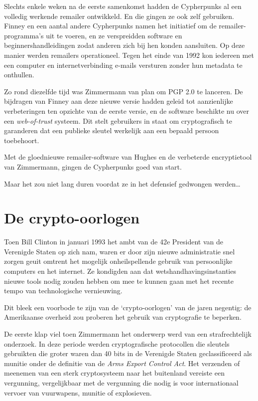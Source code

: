 \documentclass[
  a5paper,
  smalldemyvopaper,11pt,twoside,onecolumn,openright,extrafontsizes]{memoir}
\begin{document}
Slechts enkele weken na de eerste samenkomst hadden de Cypherpunks al
een volledig werkende remailer ontwikkeld. En die gingen ze ook zelf
gebruiken. Finney en een aantal andere Cypherpunks namen het initiatief
om de remailer-programma's uit te voeren, en ze verspreidden software en
beginnershandleidingen zodat anderen zich bij hen konden aansluiten. Op
deze manier werden remailers operationeel. Tegen het einde van 1992 kon
iedereen met een computer en internetverbinding e-mails versturen zonder
hun metadata te onthullen.

Zo rond diezelfde tijd was Zimmermann van plan om PGP 2.0 te lanceren.
De bijdragen van Finney aan deze nieuwe versie hadden geleid tot
aanzienlijke verbeteringen ten opzichte van de eerste versie, en de
software beschikte nu over een \emph{web-of-trust} systeem. Dit stelt
gebruikers in staat om cryptografisch te garanderen dat een publieke
sleutel werkelijk aan een bepaald persoon toebehoort.

Met de gloednieuwe remailer-software van Hughes en de verbeterde
encryptietool van Zimmermann, gingen de Cypherpunks goed van start.

Maar het zou niet lang duren voordat ze in het defensief gedwongen
werden\ldots{}

\section{De crypto-oorlogen}\label{de-crypto-oorlogen}

Toen Bill Clinton in januari 1993 het ambt van de 42e President van de
Verenigde Staten op zich nam, waren er door zijn nieuwe administratie
snel zorgen geuit omtrent het mogelijk onheilspellende gebruik van
persoonlijke computers en het internet. Ze kondigden aan dat
wetshandhavingsinstanties nieuwe tools nodig zouden hebben om mee te
kunnen gaan met het recente tempo van technologische vernieuwing.

Dit bleek een voorbode te zijn van de `crypto-oorlogen' van de jaren
negentig: de Amerikaanse overheid zou proberen het gebruik van
cryptografie te beperken.

De eerste klap viel toen Zimmermann het onderwerp werd van een
strafrechtelijk onderzoek. In deze periode werden cryptografische
protocollen die sleutels gebruikten die groter waren dan 40 bits in de
Verenigde Staten geclassificeerd als munitie onder de definitie van de
\emph{Arms Export Control Act}. Het verzenden of meenemen van een sterk
cryptosysteem naar het buitenland vereiste een vergunning, vergelijkbaar
met de vergunning die nodig is voor internationaal vervoer van
vuurwapens, munitie of explosieven.
\end{document}
